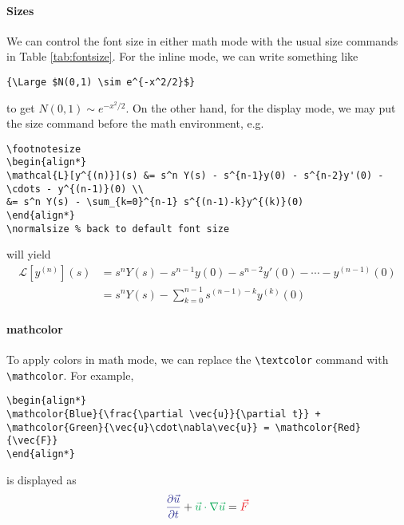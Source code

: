 \paragraph{Sizes}
We can control the font size in either math mode with the usual size commands in Table \ref{tab:fontsize}. For the inline mode, we can write something like
\begin{lstlisting}
{\Large $N(0,1) \sim e^{-x^2/2}$}
\end{lstlisting}
to get {\Large $N(0,1) \sim e^{-x^2/2}$}. On the other hand, for the display mode, we may put the size command before the math environment, e.g.\
\begin{lstlisting}
\footnotesize
\begin{align*}
\mathcal{L}[y^{(n)}](s) &= s^n Y(s) - s^{n-1}y(0) - s^{n-2}y'(0) - \cdots - y^{(n-1)}(0) \\
&= s^n Y(s) - \sum_{k=0}^{n-1} s^{(n-1)-k}y^{(k)}(0)
\end{align*}
\normalsize % back to default font size
\end{lstlisting}
will yield
\footnotesize
\begin{align*}
\mathcal{L}[y^{(n)}](s) &= s^n Y(s) - s^{n-1}y(0) - s^{n-2}y'(0) - \cdots - y^{(n-1)}(0) \\
&= s^n Y(s) - \sum_{k=0}^{n-1} s^{(n-1)-k}y^{(k)}(0)
\end{align*}
\normalsize

\paragraph{mathcolor}
To apply colors in math mode, we can replace the \texttt{\textbackslash textcolor} command with \texttt{\textbackslash mathcolor}. For example,
\begin{lstlisting}
\begin{align*}
\mathcolor{Blue}{\frac{\partial \vec{u}}{\partial t}} + \mathcolor{Green}{\vec{u}\cdot\nabla\vec{u}} = \mathcolor{Red}{\vec{F}} 
\end{align*}
\end{lstlisting}
is displayed as
\begin{align*}
\mathcolor{Blue}{\frac{\partial \vec{u}}{\partial t}} + \mathcolor{Green}{\vec{u}\cdot\nabla\vec{u}} = \mathcolor{Red}{\vec{F}} 
\end{align*}

